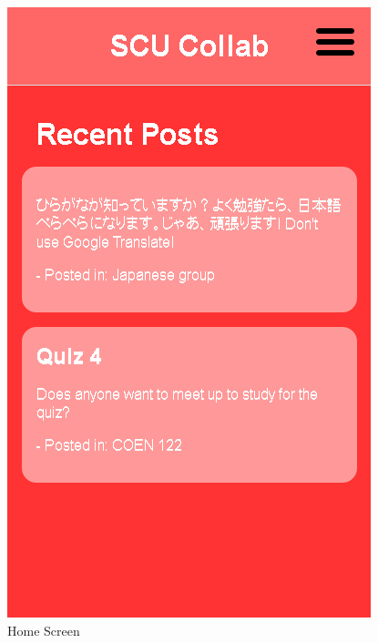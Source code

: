 \begin{figure}[h]
	\centering
	\includegraphics[scale=0.4]{images/home_screen.png}
	\caption{Home Screen}
	\label{fig:home screen}
\end{figure}

